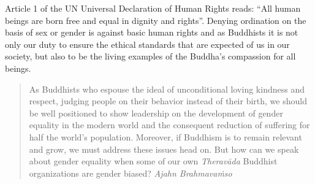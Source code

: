 Article 1 of the UN Universal Declaration of Human Rights reads: ``All human beings are born free and equal in dignity and rights''. Denying ordination on the basis of sex or gender is against basic human rights and as Buddhists it is not only our duty to ensure the ethical standards that are expected of us in our society, but also to be the living examples of the Buddha's compassion for all beings.

\begin{quote}
As Buddhists who espouse the ideal of unconditional loving kindness and respect, judging people on their behavior instead of their birth, we should be well positioned to show leadership on the development of gender equality in the modern world and the consequent reduction of suffering for half the world’s population. Moreover, if Buddhism is to remain relevant and grow, we must address these issues head on. But how can we speak about gender equality when some of our own {\em Theravāda} Buddhist organizations are gender biased? {\em Ajahn Brahmavaṁso}
\end{quote}
